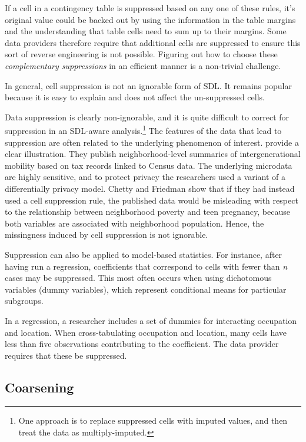 If a cell in a contingency table is suppressed based on any one of these rules, it's original value could be backed out by using the information in the table margins and the understanding that table cells need to sum up to their margins. Some data providers therefore require that additional cells are suppressed to ensure this sort of reverse engineering is not possible. Figuring out how to choose these \emph{complementary suppressions} in an efficient manner is a non-trivial challenge.

In general, cell suppression is not an ignorable form of SDL. It remains popular because it is easy to explain and does not affect the un-suppressed cells.

Data suppression is clearly non-ignorable, and it is quite difficult to correct for suppression in an SDL-aware analysis.\footnote{One approach is to replace suppressed cells with imputed values, and then treat the data as multiply-imputed.} The features of the data that lead to suppression are often related to the underlying phenomenon of interest. \citet{chetty_practical_2019} provide a clear illustration. They publish neighborhood-level summaries of intergenerational mobility based on tax records linked to Census data. The underlying microdata are highly sensitive, and to protect privacy the researchers used a variant of a differentially privacy model. Chetty and Friedman show that if they had instead used a cell suppression rule, the published data would be misleading with respect to the relationship between neighborhood poverty and teen pregnancy, because both variables are associated with neighborhood population. Hence, the missingness induced by cell suppression is not ignorable.

Suppression can also be applied to model-based statistics. For instance, after having run a regression, coefficients that correspond to cells with fewer than \emph{n} cases may be suppressed. This most often occurs when using dichotomous variables (dummy variables), which represent conditional means for particular subgroups.

\begin{bboxfix}
In a regression, a researcher includes a set of dummies for interacting
occupation and location. When cross-tabulating occupation and location,
many cells have less than five observations contributing to the
coefficient. The data provider requires that these be suppressed.
\end{bboxfix}

\hypertarget{coarsening}{%
\subsection{Coarsening}\label{coarsening}}

